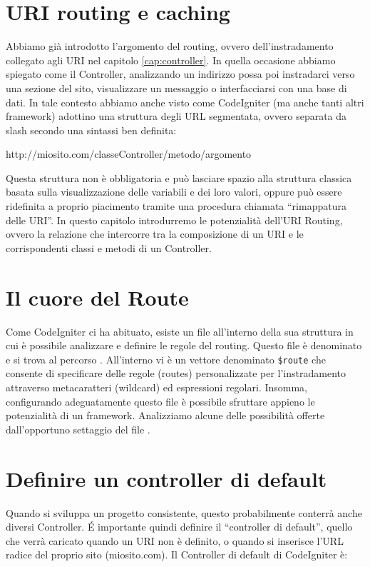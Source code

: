 \section{URI routing e caching}
\label{cap:uri}

Abbiamo già introdotto l'argomento del routing, ovvero dell'instradamento collegato agli \ac{URI} nel capitolo \vref{cap:controller}. In quella occasione abbiamo spiegato come il Controller, analizzando un indirizzo possa poi instradarci verso una sezione del sito, visualizzare un messaggio o interfacciarsi con una base di dati. In tale contesto abbiamo anche visto come CodeIgniter (ma anche tanti altri framework) adottino una struttura degli \ac{URL} segmentata, ovvero separata da slash secondo una sintassi ben definita:

\begin{code}
http://miosito.com/classeController/metodo/argomento
\end{code}

Questa struttura non è obbligatoria e può lasciare spazio alla struttura classica basata sulla visualizzazione delle variabili e dei loro valori, oppure può essere ridefinita a proprio piacimento tramite una procedura chiamata ``rimappatura delle \ac{URI}''. In questo capitolo introdurremo le potenzialità dell'URI Routing, ovvero la relazione che intercorre tra la composizione di un \ac{URI} e le corrispondenti classi e metodi di un Controller.

\section*{Il cuore del Route}
Come CodeIgniter ci ha abituato, esiste un file all'interno della sua struttura in cui è possibile analizzare e definire le regole del routing. Questo file è denominato  e si trova al percorso . All'interno vi è un vettore denominato \verb|$route| che consente di specificare delle regole (routes) personalizzate per l'instradamento attraverso metacaratteri (wildcard) ed espressioni regolari. Insomma, configurando adeguatamente questo file è possibile sfruttare appieno le potenzialità di un framework. Analizziamo alcune delle possibilità offerte dall'opportuno settaggio del file .

\section*{Definire un controller di default}
Quando si sviluppa un progetto consistente, questo probabilmente conterrà anche diversi Controller. \'E importante quindi definire il ``controller di default'', quello che verrà caricato quando un \ac{URI} non è definito, o quando si inserisce l'\ac{URL} radice del proprio sito (miosito.com). Il Controller di default di CodeIgniter è:


